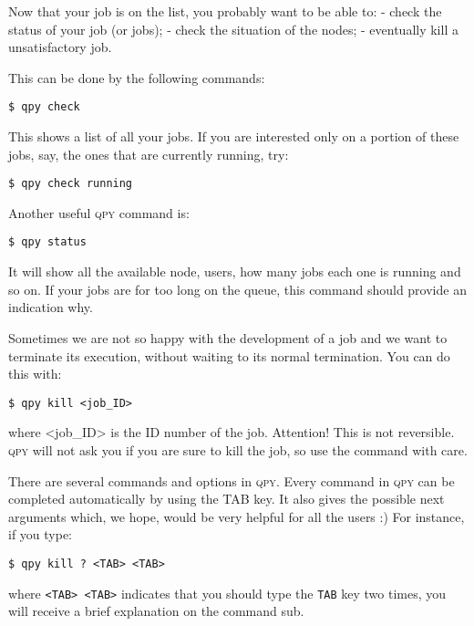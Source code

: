 \documentclass[a4paper,12pt]{article}
\newcommand{\qpy}{\textsc{qpy}}
\begin{document}
Now that your job is on the list, you probably want to be able to:
- check the status of your job (or jobs);
- check the situation of the nodes;
- eventually kill a unsatisfactory job.

This can be done by the following commands:

\begin{lstlisting}[style=BashStyle]
$ qpy check
\end{lstlisting}

This shows a list of all your jobs.
If you are interested only on a portion of these jobs, say, the ones that are currently running, try:

\begin{lstlisting}[style=BashStyle]
$ qpy check running
\end{lstlisting}

Another useful \qpy{} command is:

\begin{lstlisting}[style=BashStyle]
$ qpy status
\end{lstlisting}

It will show all the available node, users, how many jobs each one is running and so on.
If your jobs are for too long on the queue, this command should provide an indication why.

Sometimes we are not so happy with the development of a job and we want to terminate its execution, without waiting to its normal termination.
You can do this with:

\begin{lstlisting}[style=BashStyle]
$ qpy kill <job_ID>
\end{lstlisting}

where <job\_ID> is the ID number of the job.
Attention! This is not reversible.
\qpy{} will not ask you if you are sure to kill the job, so use the command with care.

There are several commands and options in \qpy{}.
Every command in \qpy{} can be completed automatically by using the TAB key.
It also gives the possible next arguments which, we hope, would be very helpful for all the users :)
For instance, if you type:

\begin{lstlisting}[style=BashStyle]
$ qpy kill ? <TAB> <TAB>
\end{lstlisting}

where \texttt{<TAB> <TAB>} indicates that you should type the \texttt{TAB} key two times, you will receive a brief explanation on the command sub.
\end{document}
